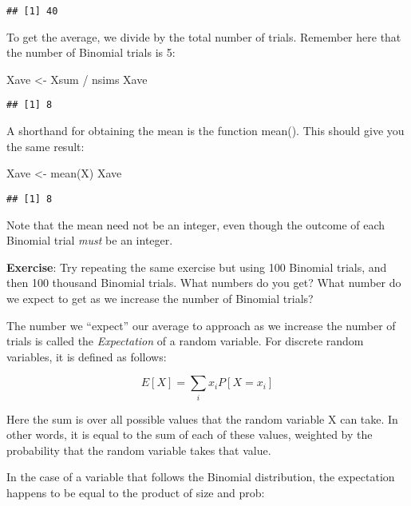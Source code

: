 \documentclass[
]{book}
\newenvironment{Shaded}{\begin{snugshade}}{\end{snugshade}}
\newcommand{\FunctionTok}[1]{\textcolor[rgb]{0.00,0.00,0.00}{#1}}
\newcommand{\NormalTok}[1]{#1}
\newcommand{\OtherTok}[1]{\textcolor[rgb]{0.56,0.35,0.01}{#1}}
\newcommand{\SpecialCharTok}[1]{\textcolor[rgb]{0.00,0.00,0.00}{#1}}
\begin{document}
\begin{verbatim}
## [1] 40
\end{verbatim}

To get the average, we divide by the total number of trials. Remember here that the number of Binomial trials is 5:

\begin{Shaded}
\begin{Highlighting}[]
\NormalTok{Xave }\OtherTok{\textless{}{-}}\NormalTok{ Xsum }\SpecialCharTok{/}\NormalTok{ nsims}
\NormalTok{Xave}
\end{Highlighting}
\end{Shaded}

\begin{verbatim}
## [1] 8
\end{verbatim}

A shorthand for obtaining the mean is the function mean(). This should give you the same result:

\begin{Shaded}
\begin{Highlighting}[]
\NormalTok{Xave }\OtherTok{\textless{}{-}} \FunctionTok{mean}\NormalTok{(X)}
\NormalTok{Xave}
\end{Highlighting}
\end{Shaded}

\begin{verbatim}
## [1] 8
\end{verbatim}

Note that the mean need not be an integer, even though the outcome of each Binomial trial \emph{must} be an integer.

\textbf{Exercise}: Try repeating the same exercise but using 100 Binomial trials, and then 100 thousand Binomial trials. What numbers do you get? What number do we expect to get as we increase the number of Binomial trials?

The number we ``expect'' our average to approach as we increase the number of trials is called the \emph{Expectation} of a random variable. For discrete random variables, it is defined as follows:

\[E[X] = \sum_{i}x_iP[X=x_i]\]

Here the sum is over all possible values that the random variable X can take. In other words, it is equal to the sum of each of these values, weighted by the probability that the random variable takes that value.

In the case of a variable that follows the Binomial distribution, the expectation happens to be equal to the product of size and prob:
\end{document}
